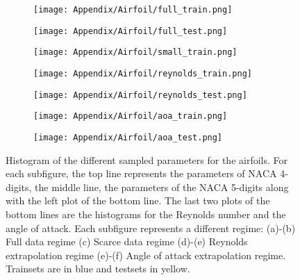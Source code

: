 \begin{subappendices}
	\begin{figure}
		\centering
		\begin{subfigure}{0.32\textwidth}
			\centering
			\texttt{[image: Appendix/Airfoil/full\_train.png]}
			\caption{}
		\end{subfigure}
		\begin{subfigure}{0.32\textwidth}
			\centering
			\texttt{[image: Appendix/Airfoil/full\_test.png]}
			\caption{}
		\end{subfigure}
		\begin{subfigure}{0.32\textwidth}
			\centering
			\texttt{[image: Appendix/Airfoil/small\_train.png]}
			\caption{}
		\end{subfigure}
		
		\begin{subfigure}{0.32\textwidth}
			\centering
			\texttt{[image: Appendix/Airfoil/reynolds\_train.png]}
			\caption{}
		\end{subfigure}
		\begin{subfigure}{0.32\textwidth}
			\centering
			\texttt{[image: Appendix/Airfoil/reynolds\_test.png]}
			\caption{}
		\end{subfigure}
		
		\begin{subfigure}{0.32\textwidth}
			\centering
			\texttt{[image: Appendix/Airfoil/aoa\_train.png]}
			\caption{}
		\end{subfigure}
		\begin{subfigure}{0.32\textwidth}
			\centering
			\texttt{[image: Appendix/Airfoil/aoa\_test.png]}
			\caption{}
		\end{subfigure}
		\caption[Histogram of the different sampled parameters for the airfoils.]{Histogram of the different sampled parameters for the airfoils. For each subfigure, the top line represents the parameters of \acrshort{NACA} 4-digits, the middle line, the parameters of the \acrshort{NACA} 5-digits along with the left plot of the bottom line. The last two plots of the bottom lines are the histograms for the Reynolds number and the angle of attack. Each subfigure represents a different regime: (a)-(b) Full data regime (c) Scarce data regime (d)-(e) Reynolds extrapolation regime (e)-(f) Angle of attack extrapolation regime. Trainsets are in blue and testsets in yellow.}
		\label{fig:naca_stats}
	\end{figure}


\end{subappendices}
